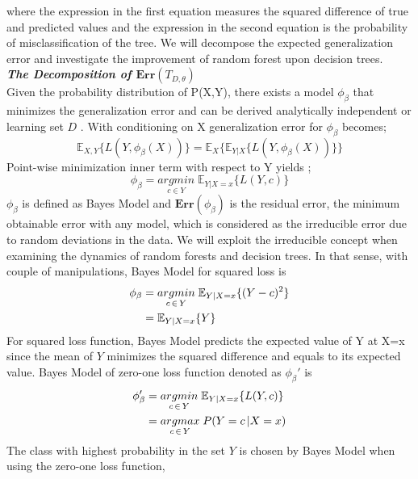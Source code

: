 where the expression in the first equation measures the squared difference of true and predicted values
and the expression in the second equation is the probability of misclassification of the tree. 
We will decompose the expected generalization error and investigate the improvement of random forest upon 
decision trees.
\vspace{2mm}
\\
\textbf{\emph{The Decomposition of $\boldsymbol{Err}(T_{D,\theta})$}}\\
Given the probability distribution of P(X,Y), there exists a model $\phi_{\beta}$ that minimizes the generalization error 
and can be derived analytically independent or learning set $D$ \cite{louppe2014understanding}. 
With conditioning on X generalization error for $\phi_{\beta}$ becomes;
\begin{equation}
\mathbb{E}_{X,Y} \{L(Y, \phi_{\beta}(X))\} = \mathbb{E}_{X}\{\mathbb{E}_{Y|X}\{L(Y, \phi_{\beta}(X)) \} \}
\end{equation}
Point-wise minimization inner term  with respect to Y yields \cite{louppe2014understanding};
\begin{equation}
\phi_{\beta} = \underset{c \in Y}{argmin} \; \mathbb{E}_{Y|X=x}\{L(Y,c)\}
\end{equation}
$\phi_{\beta}$ is defined as Bayes Model and $\boldsymbol{Err}(\phi_{\beta})$ is the residual error, 
the minimum obtainable error with any model, which is considered as the irreducible error due to random deviations in the 
data\cite{louppe2014understanding}. We will exploit the irreducible concept when examining the dynamics of random forests and 
decision trees. In that sense, with couple of manipulations, Bayes Model for squared loss is
\begin{align}
\phi_{\beta} & = \underset{c \,\in\, Y}{argmin} \; \mathbb{E}_{Y|X=x}\{(Y-c)^2 \} \notag\\
			 & = \mathbb{E}_{Y|X=x}\{Y\}
\end{align}
For squared loss function, Bayes Model predicts the expected value of Y at X=x 
since the mean of $Y$ minimizes the squared difference 
and equals to its expected value.
Bayes Model of zero-one loss function denoted as $\phi_{\beta}'$ is
\begin{align}\label{eq:bayes_model}
\phi_{\beta}' & = \underset{c \,\in\, Y}{argmin} \; \mathbb{E}_{Y|X=x}\{L(Y,c) \} \notag\\
			 & = \underset{c \,\in\, Y}{argmax} \; P(Y = c \,| X = x)
\end{align}
The class with highest probability in the set $Y$ is chosen by Bayes Model when using the zero-one loss function, 
